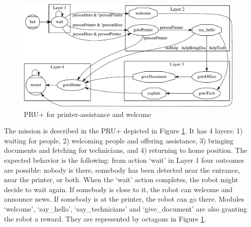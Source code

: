 \begin{figure}
\centering
\includegraphics[width=0.99\textwidth]{fig/PRU_U}
\caption{PRU+ for printer-assistance and welcome}
\label{fig:pru}
\end{figure}

The mission is described in the PRU+ depicted in Figure \ref{fig:pru}. It has 4 layers: 1) waiting for people, 2) welcoming people and offering assistance, 3) bringing documents and fetching for technicians, and 4) returning to home position.
The expected behavior is the following:
from action `wait' in Layer 1 four outcomes are possible: nobody is there, somebody has been detected near the entrance, near the printer, or both. When the `wait' action completes, the robot might decide to wait again. If somebody is close to it, the robot can welcome and announce news. If somebody is at the printer, the robot can go there.
Modules `welcome', `say\_hello', `say\_technicians' and `give\_document' are also granting the robot a reward. They are represented by octagons in Figure  \ref{fig:pru}.

%


